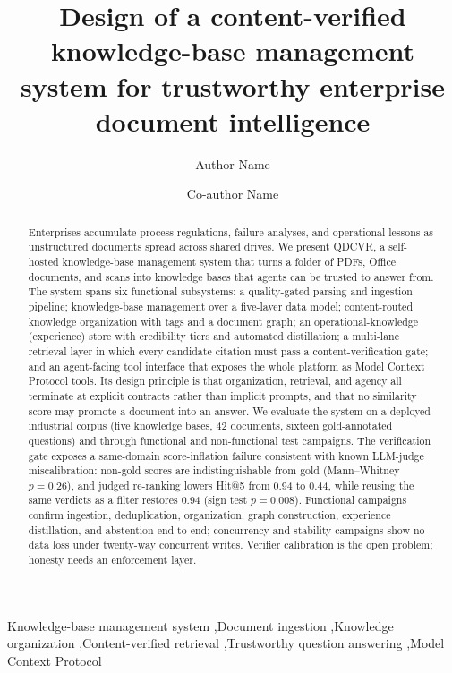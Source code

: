 \documentclass[preprint,12pt]{elsarticle}
\begin{document}
\begin{frontmatter}

\title{Design of a content-verified knowledge-base management system for
trustworthy enterprise document intelligence}

\author[inst1]{Author Name}
\author[inst1]{Co-author Name}

\begin{abstract}
Enterprises accumulate process regulations, failure analyses, and operational
lessons as unstructured documents spread across shared drives. We present
QDCVR, a self-hosted knowledge-base management system that turns a folder of
PDFs, Office documents, and scans into knowledge bases that agents can be
trusted to answer from. The system spans six functional subsystems: a
quality-gated parsing and ingestion pipeline; knowledge-base management over a
five-layer data model; content-routed knowledge organization with tags and a
document graph; an operational-knowledge (experience) store with credibility
tiers and automated distillation; a multi-lane retrieval layer in which every
candidate citation must pass a content-verification gate; and an agent-facing
tool interface that exposes the whole platform as Model Context Protocol
tools. Its design principle is that organization, retrieval, and agency all
terminate at explicit contracts rather than implicit prompts, and that no
similarity score may promote a document into an answer. We evaluate the system
on a deployed industrial corpus (five knowledge bases, 42 documents, sixteen
gold-annotated questions) and through functional and non-functional test
campaigns. The verification gate exposes a same-domain score-inflation failure
consistent with known LLM-judge miscalibration: non-gold scores are
indistinguishable from gold (Mann--Whitney $p = 0.26$), and judged re-ranking
lowers Hit@5 from 0.94 to 0.44, while reusing the same verdicts as a filter
restores 0.94 (sign test $p = 0.008$). Functional campaigns confirm ingestion,
deduplication, organization, graph construction, experience distillation, and
abstention end to end; concurrency and stability campaigns show no data loss
under twenty-way concurrent writes. Verifier calibration is the open problem;
honesty needs an enforcement layer.
\end{abstract}

\begin{keyword}
Knowledge-base management system \sep Document ingestion \sep Knowledge
organization \sep Content-verified retrieval \sep Trustworthy question
answering \sep Model Context Protocol
\end{keyword}

\end{frontmatter}
\end{document}

